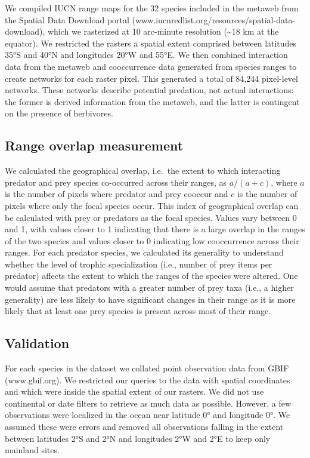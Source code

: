 \documentclass[10pt,oneside]{article}
\begin{document}
We compiled IUCN range maps for the 32 species included in the metaweb
from the Spatial Data Download portal
(www.iucnredlist.org/resources/spatial-data-download), which we
rasterized at 10 arc-minute resolution (\textasciitilde18 km at the
equator). We restricted the rasters a spatial extent comprised between
latitudes 35°S and 40°N and longitudes 20°W and 55°E. We then combined
interaction data from the metaweb and cooccurrence data generated from
species ranges to create networks for each raster pixel. This generated
a total of 84,244 pixel-level networks. These networks describe
potential predation, not actual interactions: the former is derived
information from the metaweb, and the latter is contingent on the
presence of herbivores.

\hypertarget{range-overlap-measurement}{%
\subsection{Range overlap measurement}\label{range-overlap-measurement}}

We calculated the geographical overlap, i.e.~the extent to which
interacting predator and prey species co-occurred across their ranges,
as \(a/(a + c)\), where \(a\) is the number of pixels where predator and
prey cooccur and \(c\) is the number of pixels where only the focal
species occur. This index of geographical overlap can be calculated with
prey or predators as the focal species. Values vary between 0 and 1,
with values closer to 1 indicating that there is a large overlap in the
ranges of the two species and values closer to 0 indicating low
cooccurrence across their ranges. For each predator species, we
calculated its generality to understand whether the level of trophic
specialization (i.e., number of prey items per predator) affects the
extent to which the ranges of the species were altered. One would assume
that predators with a greater number of prey taxa (i.e., a higher
generality) are less likely to have significant changes in their range
as it is more likely that at least one prey species is present across
most of their range.

\hypertarget{validation}{%
\subsection{Validation}\label{validation}}

For each species in the dataset we collated point observation data from
GBIF (www.gbif.org). We restricted our queries to the data with spatial
coordinates and which were inside the spatial extent of our rasters. We
did not use continental or date filters to retrieve as much data as
possible. However, a few observations were localized in the ocean near
latitude 0° and longitude 0°. We assumed these were errors and removed
all observations falling in the extent between latitudes 2°S and 2°N and
longitudes 2°W and 2°E to keep only mainland sites.
\end{document}
